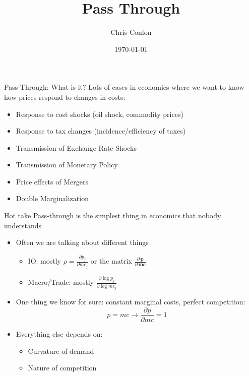 

\usepackage{tabularx}
\usepackage{dcolumn}
\usepackage{ragged2e}
\usepackage{multirow,multicol,dcolumn}





\title{Pass Through}
\author{Chris Conlon}
\date{\today}

\frame{\titlepage}


\begin{frame}{Pass-Through: What is it?}
Lots of cases in economics where we want to know how prices respond to changes in costs:

\begin{itemize}
    \item Response to cost shocks (oil shock, commodity prices)
    \item Response to tax changes (incidence/efficiency of taxes)
    \item Transmission of Exchange Rate Shocks
    \item Transmission of Monetary Policy
    \item Price effects of Mergers
    \item Double Marginalization
\end{itemize}
\end{frame}


\begin{frame}{Hot take}
Pass-through is the simplest thing in economics that nobody understands
\begin{itemize}
\item Often we are talking about different things
\begin{itemize}
\item IO: mostly $\rho = \frac{\partial p_j}{\partial mc_j}$ or the matrix $\frac{\partial\, \symbf{p}}{\partial\, \symbf{mc}}$
\item Macro/Trade: mostly $\frac{\partial \log p_j}{\partial \log mc_j}$
\end{itemize}
\item One thing we know for sure: constant marginal costs, perfect competition: \\
 $$p = mc \rightarrow \frac{\partial p}{\partial mc} = 1$$
 \item Everything else depends on:
\begin{itemize}
\item Curvature of demand
\item Nature of competition
\end{itemize}
\end{itemize}
\end{frame}

